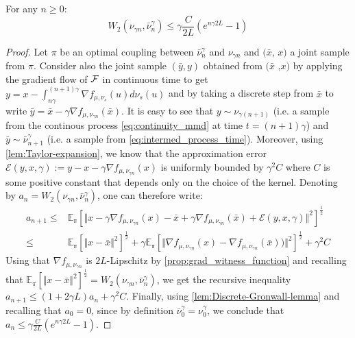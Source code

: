 \begin{lemma}\label{lem:euler_error_1}
For any $n\geq0$:
\begin{equation*}
W_{2}(\nu_{\gamma n},\bar{\nu}_{n}^{\gamma})\le\gamma\frac{C}{2L}(e^{n\gamma 2L}-1)
\end{equation*}
\end{lemma}
\begin{proof}
Let $\pi$ be an optimal coupling between $\bar{\nu}_{n}^{\gamma}$
and $\nu_{\gamma n}$ and  $(\bar{x}$, $x)$ a joint sample
from $\pi$. Consider also the joint sample $(\bar{y},y)$ obtained from  $(\bar{x}$ ,$x)$ by applying the gradient flow of ${{\mathcal F}}$ in continuous time to get $y=x-\int_{n\gamma}^{(n+1)\gamma}\nabla f_{\mu,\nu_{s}}(u)d\nu_{s}(u)$ and by taking a discrete step from $\bar{x}$ to write $\bar{y}=\bar{x}-\gamma\nabla f_{\mu,\nu_{\gamma n}}(\bar{x})$. It is easy to see that $y\sim\nu_{\gamma(n+1)}$ (i.e. a sample from the continous process \eqref{eq:continuity_mmd} at time $t=(n+1)\gamma$) and $\bar{y}\sim\bar{\nu}_{n+1}^{\gamma}$ (i.e. a sample from \eqref{eq:intermed_process_time}). Moreover, using \cref{lem:Taylor-expansion}, we know that the approximation error $\mathcal{E}(y,x,\gamma):=y-x-\gamma\nabla f_{\mu,\nu_{\gamma n}}(x)$ is uniformly bounded by $\gamma^{2}C$ where $C$ is some positive constant that depends only on the choice of the kernel. Denoting by $a_{n}=W_{2}(\nu_{\gamma n},\bar{\nu}_{n}^{\gamma})$, one can therefore write:
\begin{align*}
a_{n+1}\leq & \mathbb{E_{\pi}}\left[\Vert x-\gamma\nabla f_{\mu,\nu_{\gamma n}}(x)-\bar{x}+\gamma\nabla f_{\mu,\nu_{\gamma n}}(\bar{x})+\mathcal{E}(y,x,\gamma)\Vert^{2}\right]^{\frac{1}{2}}\\
\leq & \mathbb{E_{\pi}}\left[\Vert x-\bar{x}\Vert^{2}\right]^{\frac{1}{2}}+\gamma\mathbb{E_{\pi}}\left[\Vert\nabla f_{\mu,\nu_{\gamma n}}(x)-\nabla f_{\mu,\nu_{\gamma n}}(\bar{x}))\Vert^{2}\right]^{\frac{1}{2}}+\gamma^{2}C
\end{align*}
Using that $\nabla f_{\mu,\nu_{\gamma n}}$ is $2L$-Lipschitz by \cref{prop:grad_witness_function} and
recalling that $\mathbb{E}_{\pi}\left[\Vert x-\bar{x}\Vert^{2}\right]^{\frac{1}{2}}=W_{2}(\nu_{\gamma n},\bar{\nu}_{n}^{\gamma})$, we get the recursive inequality $a_{n+1}\leq(1+2 \gamma L)a_{n}+\gamma^{2}C$. Finally, 
using \cref{lem:Discrete-Gronwall-lemma} and recalling that $a_{0}=0$, since by
definition $\bar{\nu}_{0}^{\gamma}=\nu_{0}^{\gamma}$, we conclude that $a_{n}\leq\gamma\frac{C}{2L}(e^{n\gamma 2L}-1)$.
\end{proof}
